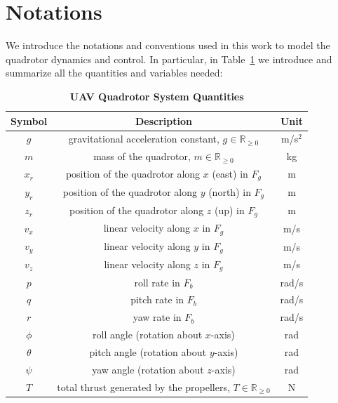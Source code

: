 \section{Notations}
We introduce the notations and conventions used in this work 
to model the quadrotor dynamics and control. 
In particular, in Table~\ref{tab:notations} we introduce and 
summarize all the quantities and variables needed:
\begin{table}[h!]
    \centering
    \caption{\textbf{UAV Quadrotor System Quantities}}
    \begin{tabular}{ccc}
        \hline\hline
        \textbf{Symbol} & \textbf{Description} & \textbf{Unit} \\
        \hline
        \(g\) & gravitational acceleration constant, \( g \in \mathbb{R}_{\geq 0} \) & m/s\(^2\) \\
        \(m\) & mass of the quadrotor, \( m \in \mathbb{R}_{\geq 0} \) & kg \\
        \(x_r\) & position of the quadrotor along \(x\) (east) in \(F_g\) & m \\
        \(y_r\) & position of the quadrotor along \(y\) (north) in \(F_g\) & m \\
        \(z_r\) & position of the quadrotor along \(z\) (up) in \(F_g\) & m \\
        \(v_x\) & linear velocity along \(x\) in \(F_g\) & m/s \\
        \(v_y\) & linear velocity along \(y\) in \(F_g\) & m/s \\
        \(v_z\) & linear velocity along \(z\) in \(F_g\) & m/s \\
        \(p\) & roll rate in \(F_b\) & rad/s \\
        \(q\) & pitch rate in \(F_b\) & rad/s \\
        \(r\) & yaw rate in \(F_b\) & rad/s \\
        \(\phi\) & roll angle (rotation about \(x\)-axis) & rad \\
        \(\theta\) & pitch angle (rotation about \(y\)-axis) & rad \\
        \(\psi\) & yaw angle (rotation about \(z\)-axis) & rad \\
        \(T\) & total thrust generated by the propellers, \( T \in \mathbb{R}_{\geq 0} \) & N \\
        \hline\hline
    \end{tabular}
    \label{tab:notations}
\end{table}

